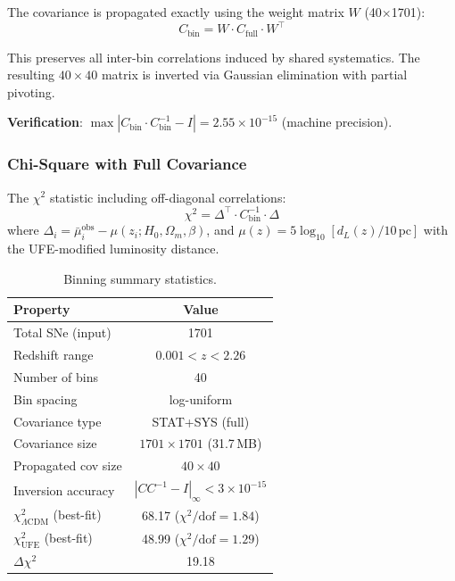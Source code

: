 \documentclass[twocolumn,showpacs,preprintnumbers,amsmath,amssymb,prl]{revtex4-2}
\begin{document}
The covariance is propagated exactly using the weight matrix $W$ (40$\times$1701):
\begin{equation}
\boxed{C_\text{bin} = W \cdot C_\text{full} \cdot W^\top}
\label{eq:cov_prop}
\end{equation}

This preserves all inter-bin correlations induced by shared systematics. The resulting $40\times40$ matrix is inverted via Gaussian elimination with partial pivoting.

\textbf{Verification}: $\max|C_\text{bin} \cdot C_\text{bin}^{-1} - I| = 2.55 \times 10^{-15}$ (machine precision).

\subsubsection{Chi-Square with Full Covariance}

The $\chi^2$ statistic including off-diagonal correlations:
\begin{equation}
\boxed{\chi^2 = \Delta^\top \cdot C_\text{bin}^{-1} \cdot \Delta}
\label{eq:chi2_fullcov}
\end{equation}
where $\Delta_i = \bar{\mu}_i^\text{obs} - \mu(z_i; H_0, \Omega_m, \beta)$, and $\mu(z) = 5\log_{10}[d_L(z)/10\,\text{pc}]$ with the UFE-modified luminosity distance.

\begin{table}[h]
\caption{Binning summary statistics.}
\label{tab:binning}
\begin{ruledtabular}
\begin{tabular}{lc}
Property & Value \\
\hline
Total SNe (input) & 1701 \\
Redshift range & $0.001 < z < 2.26$ \\
Number of bins & 40 \\
Bin spacing & log-uniform \\
Covariance type & STAT+SYS (full) \\
Covariance size & $1701 \times 1701$ (31.7\,MB) \\
Propagated cov size & $40 \times 40$ \\
Inversion accuracy & $|CC^{-1} - I|_\infty < 3\times10^{-15}$ \\
$\chi^2_{\Lambda\text{CDM}}$ (best-fit) & 68.17 ($\chi^2/\text{dof} = 1.84$) \\
$\chi^2_\text{UFE}$ (best-fit) & 48.99 ($\chi^2/\text{dof} = 1.29$) \\
$\Delta\chi^2$ & 19.18 \\
\end{tabular}
\end{ruledtabular}
\end{table}
\end{document}
